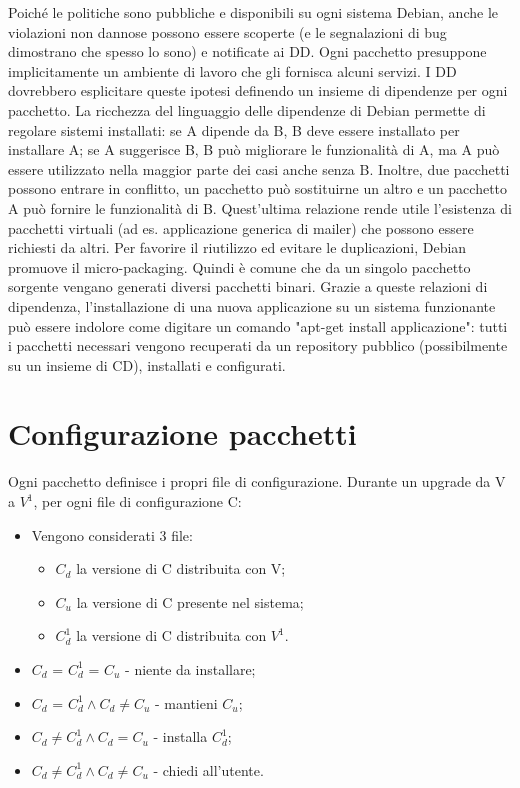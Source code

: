 \documentclass[a4paper,12pt,titlepage,oneside]{book}
\begin{document}
    Poiché le politiche sono pubbliche e disponibili su ogni sistema Debian, anche le violazioni non dannose possono essere scoperte (e le segnalazioni di bug dimostrano che spesso lo sono) e notificate ai DD.
    Ogni pacchetto presuppone implicitamente un ambiente di lavoro che gli fornisca alcuni servizi. I DD dovrebbero esplicitare queste ipotesi definendo un insieme di dipendenze per ogni pacchetto.
    La ricchezza del linguaggio delle dipendenze di Debian permette di regolare sistemi installati: se A dipende da B, B deve essere installato per
    installare A; se A suggerisce B, B può migliorare le funzionalità di A, ma A può essere utilizzato nella maggior parte dei casi anche senza B.
    Inoltre, due pacchetti possono entrare in conflitto, un pacchetto può sostituirne un altro e un pacchetto A può fornire le funzionalità di B. Quest'ultima relazione rende utile l'esistenza di pacchetti virtuali (ad es.
    applicazione generica di mailer) che possono essere richiesti da altri. Per favorire il riutilizzo ed evitare le duplicazioni, Debian promuove il micro-packaging.
    Quindi è comune che da un singolo pacchetto sorgente vengano generati diversi pacchetti binari. Grazie a queste relazioni di dipendenza, l'installazione di una nuova applicazione su un sistema funzionante può essere
    indolore come digitare un comando "apt-get install applicazione": tutti i pacchetti necessari vengono recuperati da un repository pubblico (possibilmente su un insieme di CD), installati e configurati. 

\section{Configurazione pacchetti}
Ogni pacchetto definisce i propri file di configurazione. Durante un upgrade da V a $V^1$, per ogni file di configurazione C:
\begin{itemize}
    \item Vengono considerati 3 file:
    \begin{itemize}
        \item $C_d$ la versione di C distribuita con V;
        \item $C_u$ la versione di C presente nel sistema;
        \item $C^1_d$ la versione di C distribuita con $V^1$.
    \end{itemize}
    \item $C_d$ = $C^1_d$ = $C_u$ - niente da installare;
    \item $C_d$ = $C^1_d \wedge C_d \ne C_u$ - mantieni $C_u$;
    \item $C_d \ne C^1_d \wedge C_d = C_u$ - installa $C^1_d$;
    \item $C_d \ne C^1_d \wedge C_d \ne C_u$ - chiedi all'utente.
\end{itemize}
\end{document}
